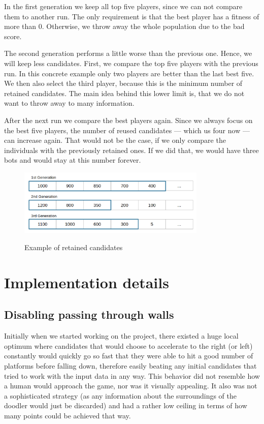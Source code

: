 \documentclass[a4paper,12pt,pagesize,headsepline,bibtotoc,titlepage,abstracton]{scrartcl}
\begin{document}
In the first generation we keep all top five players, since we can not compare them to another run. The only requirement is that the best player has a fitness of more than 0. Otherwise, we throw away the whole population due to the bad score.

The second generation performs a little worse than the previous one. Hence, we will keep less candidates. First, we compare the top five players with the previous run. In this concrete example only two players are better than the last best five. We then also select the third player, because this is the minimum number of retained candidates. The main idea behind this lower limit is, that we do not want to throw away to many information.

After the next run we compare the best players again. Since we always focus on the best five players, the number of reused candidates --- which us four now --- can increase again. That would not be the case, if we only compare the individuals with the previously retained ones. If we did that, we would have three bots and would stay at this number forever.

\begin{figure}[h]
\begin{center}
\includegraphics*[width=0.8\textwidth]{images/retain_candidates}\\
\caption{Example of retained candidates}
\label{abb:retaining}
\end{center}
\end{figure}



\section{Implementation details}
\label{sec:id}
\subsection{Disabling passing through walls}

Initially when we started working on the project, there existed a huge local optimum where candidates that would choose to accelerate to the right (or left) constantly would quickly go so fast that they were able to hit a good number of platforms before falling down, therefore easily beating any initial candidates that tried to work with the input data in any way. This behavior did not resemble how a human would approach the game, nor was it visually appealing. It also was not a sophisticated strategy (as any information about the surroundings of the doodler would just be discarded) and had a rather low ceiling in terms of how many points could be achieved that way.
\end{document}
